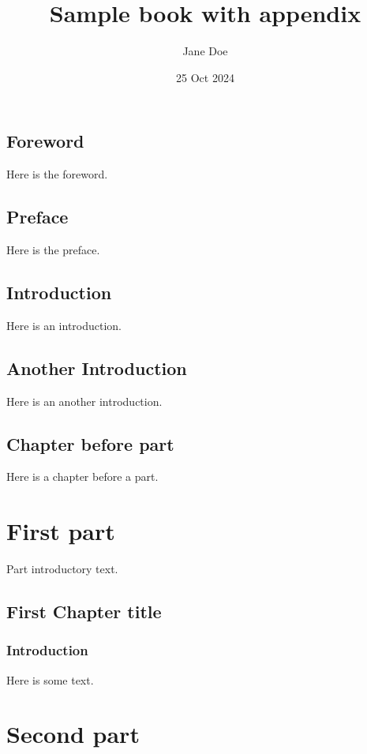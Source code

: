 \documentclass{amsbook}
\title{Sample book with appendix}
\author{Jane Doe}
\date{25 Oct 2024}
\begin{document}
\frontmatter

\tableofcontents

\makededication

\chapter*{Foreword}

Here is the foreword.

\chapter*{Preface}

Here is the preface.

\chapter*{Introduction}

Here is an introduction.

\chapter*{Another Introduction}

Here is an another introduction.

\mainmatter

\chapter{Chapter before part}

Here is a chapter before a part.

\part{First part}

Part introductory text.

\chapter{First Chapter title}

\section{Introduction}

Here is some text.

\part{Second part}
\end{document}
